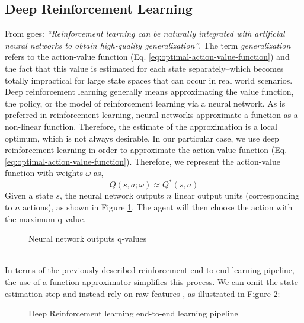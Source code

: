 \subsection{Deep Reinforcement Learning}

From \cite{deeprlcourse} goes: \textit{``Reinforcement learning can be naturally integrated with artificial neural networks to obtain high-quality generalization''}.
The term \textit{generalization} refers to the action-value function (Eq. \ref{eq:optimal-action-value-function}) and the fact that this value is estimated for each state separately--which becomes totally impractical for large state spaces that can occur in real world scenarios.
Deep reinforcement learning generally means approximating the value function, the policy, or the model of reinforcement learning via a neural network.
As is preferred in reinforcement learning, neural networks approximate a function as a non-linear function.
Therefore, the estimate of the approximation is a local optimum, which is not always desirable.
In our particular case, we use deep reinforcement learning in order to approximate the action-value function (Eq. \ref{eq:optimal-action-value-function}). 
Therefore, we represent the action-value function with weights $\omega$ as,
\begin{equation}
Q(s, a; \omega) \approx Q^*(s,a)
\end{equation}
Given a state $s$, the neural network outputs $n$ linear output units (corresponding to $n$ actions), as shown in Figure \ref{fig:drl-qvalues}.
The agent will then choose the action with the maximum q-value.
\begin{figure}[H]
    \centering
    \caption{Neural network outputs q-values}
    \label{fig:drl-qvalues}
\end{figure}
\hfill
\\
In terms of the previously described reinforcement end-to-end learning pipeline, the use of a function approximator simplifies this process.
We can omit the state estimation step and instead rely on raw features \cite{mnih2013playing}, as illustrated in Figure \ref{fig:drl-pipeline}:
\begin{figure}[H]
    \centering
    \caption{Deep Reinforcement learning end-to-end learning pipeline}
    \label{fig:drl-pipeline}
\end{figure}
